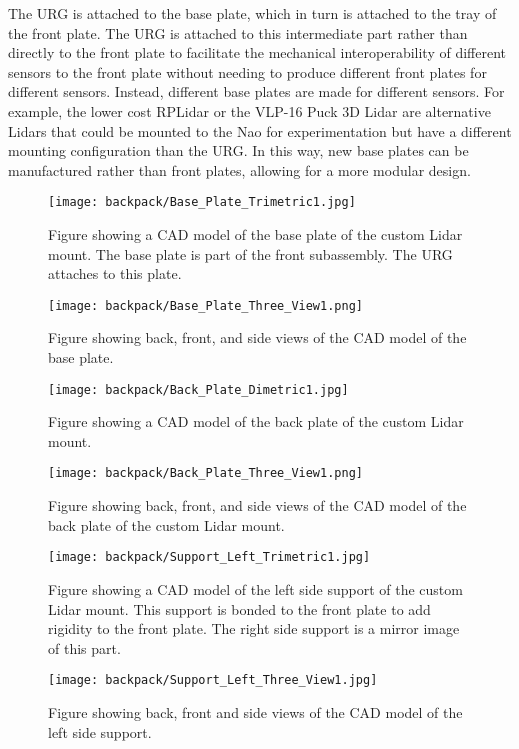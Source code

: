 The URG is attached to the base plate, which in turn is attached to the 
tray of the front plate. The URG is attached to this intermediate part
rather than directly to the front plate to facilitate the mechanical
interoperability of different sensors to the front plate without needing
to produce different front plates for different sensors. Instead, different
base plates are made for different sensors. For example, the lower cost
RPLidar \cite{rp_lidar} or the VLP-16 Puck 3D Lidar
\cite{puck_lidar} are alternative Lidars that could
be mounted to the Nao for experimentation but have a different mounting 
configuration than the URG\@. In this way, new base plates can be manufactured
rather than front plates, allowing for a more modular design.

\begin{figure}
\centering
\texttt{[image: backpack/Base\_Plate\_Trimetric1.jpg]}
\caption{Figure showing a CAD model of the base plate of the custom Lidar
         mount. The base plate is part of the front subassembly.
         The URG attaches to this plate.}
\label{fig:nao_lidar_mount_baseplate_trimetric1}
\end{figure}

\begin{figure}
\centering
\texttt{[image: backpack/Base\_Plate\_Three\_View1.png]}
\caption{Figure showing back, front, and side views of the CAD model of the
         base plate.}
\label{fig:nao_lidar_mount_baseplate_three_view1}
\end{figure}

\begin{figure}
\centering
\texttt{[image: backpack/Back\_Plate\_Dimetric1.jpg]}
\caption{Figure showing a CAD model of the back plate of the custom
         Lidar mount.}
\label{fig:nao_lidar_mount_backplate_dimetric1}
\end{figure}

\begin{figure}
\centering
\texttt{[image: backpack/Back\_Plate\_Three\_View1.png]}
\caption{Figure showing back, front, and side views of the CAD model of the
         back plate of the custom Lidar mount.}
\label{fig:nao_lidar_mount_backplate_three_view1}
\end{figure}



\begin{figure}
\centering
\texttt{[image: backpack/Support\_Left\_Trimetric1.jpg]}
\caption{Figure showing a CAD model of the left side support of the custom
         Lidar mount. This support is bonded to the front plate to add rigidity
         to the front plate. The right side support is a mirror image of this
         part.}
\label{fig:nao_lidar_mount_supportleft_trimetric1}
\end{figure}

\begin{figure}
\centering
\texttt{[image: backpack/Support\_Left\_Three\_View1.jpg]}
\caption{Figure showing back, front and side views of the CAD model of the left
         side support.}
\label{fig:nao_lidar_mount_supportleft_three_view1}
\end{figure}


